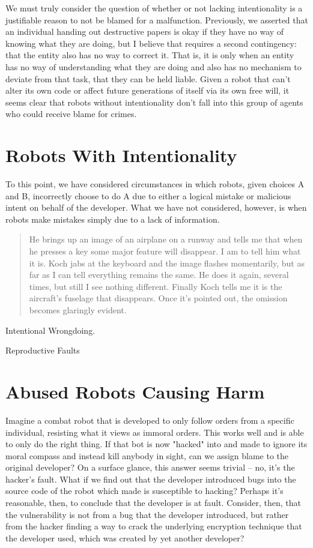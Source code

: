 \documentclass[12]{article}
\begin{document}
	We must truly consider the question of whether or not lacking intentionality is a justifiable reason to not be blamed for a malfunction. Previously, we asserted that an individual handing out destructive papers is okay if they have no way of knowing what they are doing, but I believe that requires a second contingency: that the entity also has no way to correct it. That is, it is only when an entity has no way of understanding what they are doing and also has no mechanism to deviate from that task, that they can be held liable. Given a robot that can't alter its own code or affect future generations of itself via its own free will, it seems clear that robots without intentionality don't fall into this group of agents who could receive blame for crimes.

\section{Robots With Intentionality}
	
	To this point, we have considered circumstances in which robots, given choices A and B, incorrectly choose to do A due to either a logical mistake or malicious intent on behalf of the developer. What we have not considered, however, is when robots make mistakes simply due to a lack of information.			
		
	\begin{quote}
		He brings up an image of an airplane on a runway and tells me that when he presses a key some major feature will disappear. I am to tell him what it is. Koch jabs at the keyboard and the image flashes momentarily, but as far as I can tell everything remains the same. He does it again, several times, but still I see nothing different. Finally Koch tells me it is the aircraft’s fuselage that disappears. Once it’s pointed out, the omission becomes glaringly evident.\cite{zombie_within}
	\end{quote}
		
	Intentional Wrongdoing.		

	Reproductive Faults

\section{Abused Robots Causing Harm}	
	Imagine a combat robot that is developed to only follow orders from a specific individual, resisting what it views as immoral orders. This works well and is able to only do the right thing. If that bot is now "hacked" into and made to ignore its moral compass and instead kill anybody in sight, can we assign blame to the original developer? On a surface glance, this answer seems trivial -- no, it's the hacker's fault. What if we find out that the developer introduced bugs into the source code of the robot which made is susceptible to hacking? Perhaps it's reasonable, then, to conclude that the developer is at fault. Consider, then, that the vulnerability is not from a bug that the developer introduced, but rather from the hacker finding a way to crack the underlying encryption technique that the developer used, which was created by yet another developer? 
	
\end{document}
